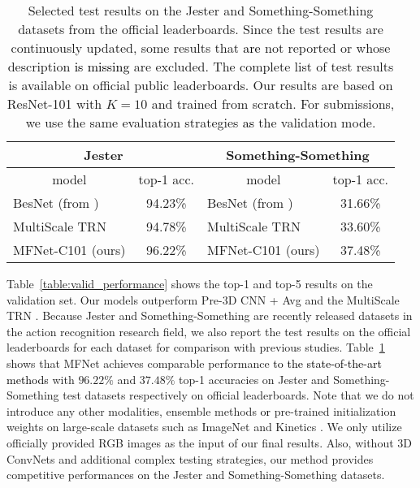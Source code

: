 \documentclass[runningheads]{llncs}
\newcommand{\nj}[1]{\textcolor{black}{#1}}
\begin{document}
\setlength{\tabcolsep}{4pt}
\begin{table}[t]
\begin{center}
\caption{Selected test results on the Jester and Something-Something datasets from the official leaderboards. Since the test results are continuously updated, some results that \nj{are} not reported or whose description \nj{is missing} are excluded. The complete list of test results is available on official public leaderboards. Our results are based on ResNet-101 with $K=10$ and trained from scratch. For submissions, we use the same evaluation strategies \nj{as} the validation mode.}
\begin{tabular}{l|c|l|c}
\hline
\multicolumn{2}{c|}{Jester} & \multicolumn{2}{c}{Something-Something} \\
\hline
\multicolumn{1}{c|}{model} & \multicolumn{1}{c|}{top-1 acc.} & \multicolumn{1}{c|}{model} & \multicolumn{1}{c}{top-1 acc.} \\
\hline
BesNet (from \cite{zhou2017temporal}) 	&94.23\%&BesNet (from \cite{zhou2017temporal}) 		&31.66\%\\
MultiScale TRN \cite{zhou2017temporal}	&94.78\%&MultiScale TRN \cite{zhou2017temporal} 	  &33.60\%\\
\hline
MFNet-C101 (ours)	 &96.22\%&MFNet-C101 (ours)			&37.48\%\\
\hline
\end{tabular}
\label{table:test_performance}
\end{center}
\end{table}
\setlength{\tabcolsep}{1.4pt}


Table~\ref{table:valid_performance} shows the top-1 and top-5 results on the validation set. Our models outperform Pre-3D CNN + Avg \cite{goyal2017something} and the MultiScale TRN \cite{zhou2017temporal}. Because Jester and Something-Something are recently released datasets in the action recognition research field, we also report the test results on the official leaderboards for each dataset for comparison with previous studies. Table~\ref{table:test_performance} shows that MFNet achieves comparable performance \nj{to the state-of-the-art methods} with $96.22\%$ and $37.48\%$ top-1 accuracies on Jester and Something-Something test datasets respectively on official leaderboards. Note that we do not introduce any other modalities, ensemble methods \nj{or} pre-trained initialization weights on large-scale datasets such as ImageNet \cite{deng2009imagenet} and Kinetics \cite{kay2017kinetics}. We only utilize officially provided RGB images as the input of our final results. Also, without 3D ConvNets and additional complex testing strategies, our method provides competitive performances on the Jester and Something-Something datasets.   
\end{document}
